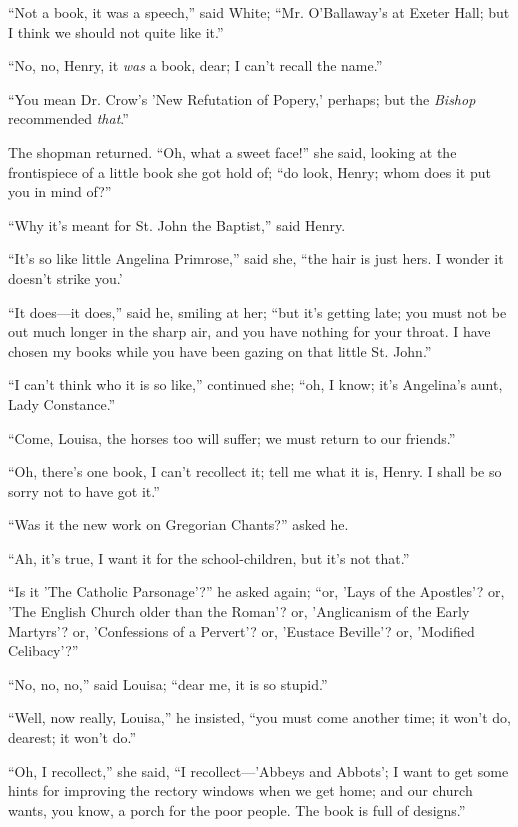 ``Not a book, it was a speech,'' said White; ``Mr. O'Ballaway's
at Exeter Hall; but I think we should not quite like it.''

``No, no, Henry, it \emph{was} a book, dear; I can't recall the
name.''

``You mean Dr. Crow's 'New Refutation of Popery,' perhaps; but
the \emph{Bishop} recommended \emph{that}.''

The shopman returned. ``Oh, what a sweet face!'' she said,
looking at the frontispiece of a little book she got hold of; ``do
look, Henry; whom does it put you in mind of?''

``Why it's meant for St. John the Baptist,'' said Henry.

``It's so like little Angelina Primrose,'' said she,
``the hair is just hers. I wonder it doesn't strike you.'

``It does—it does,'' said he, smiling at her; ``but
it's getting late; you must not be out much longer in the sharp air,
and you have nothing for your throat. I have chosen my books while you
have been gazing on that little St. John.''

``I can't think who it is so like,'' continued she;
``oh, I know; it's Angelina's aunt, Lady Constance.''

``Come, Louisa, the horses too will suffer; we must return to
our friends.''

``Oh, there's one book, I can't recollect it; tell me what it
is, Henry. I shall be so sorry not to have got it.''

``Was it the new work on Gregorian Chants?'' asked he.

``Ah, it's true, I want it for the school-children, but it's
not that.''

``Is it 'The Catholic Parsonage'?'' he asked again;
``or, 'Lays of the Apostles'? or, 'The English Church older than
the Roman'? or, 'Anglicanism of the Early Martyrs'? or, 'Confessions
of a Pervert'? or, 'Eustace Beville'? or, 'Modified Celibacy'?''

``No, no, no,'' said Louisa; ``dear me, it is so
stupid.''

``Well, now really, Louisa,'' he insisted, ``you must
come another time; it won't do, dearest; it won't do.''

``Oh, I recollect,'' she said, ``I recollect—'Abbeys
and Abbots'; I want to get some hints for improving the rectory
windows when we get home; and our church wants, you know, a porch for
the poor people. The book is full of designs.''

